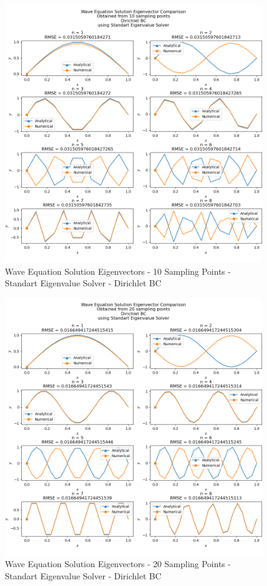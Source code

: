 \documentclass[letterpaper,12pt]{article}
\begin{document}
\begin{figure}[H]
\centerline{\includegraphics[width=\linewidth]{figures/1_10_Standart_Eigenvalue_Solver_d_eigenvector.png}}
\caption{Wave Equation Solution Eigenvectors - 10 Sampling Points - Standart Eigenvalue Solver - Dirichlet BC}
\label{fig:1_10_Standart_Eigenvalue_Solver_d_eigenvector}
\end{figure}

\begin{figure}[H]
\centerline{\includegraphics[width=\linewidth]{figures/1_20_Standart_Eigenvalue_Solver_d_eigenvector.png}}
\caption{Wave Equation Solution Eigenvectors - 20 Sampling Points - Standart Eigenvalue Solver - Dirichlet BC}
\label{fig:1_20_Standart_Eigenvalue_Solver_d_eigenvector}
\end{figure}
\end{document}
